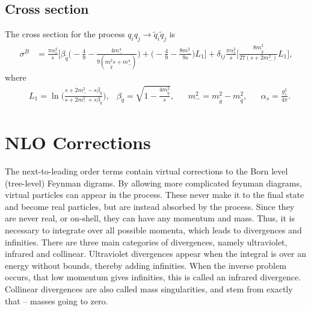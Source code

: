 \documentclass[twoside,english]{uiofysmaster}
\begin{document}
\subsection*{Cross section}

The cross section for the process $q_iq_j \rightarrow \tilde{q}_i \tilde{q}_j$ is \cite{beenakker1997squark}
\begin{align*}
\sigma^B &= \frac{\pi \alpha_s^2}{s} \Bigg[\beta_{\tilde{q}} \Big(-\frac{4}{9} - \frac{4m_-^4}{9(m_{\tilde{g}}^2s+m_-^4)} \Big) + \Big(-\frac{4}{9}- \frac{8m_-^2}{9s} \Big) L_1 \Bigg]
+ \delta_{ij} \frac{\pi \alpha_s^2}{s} \Bigg[ \frac{8m_{\tilde{g}}^2}{27(s+2m_-^2)} L_1 \Bigg],
\end{align*}
where
\begin{align*}
&L_1 = \ln \Big( \frac{s+2m_-^2-s \beta_{\tilde{q}}}{s+ 2m_-^2+s \beta_{\tilde{q}}} \Big), &\beta_{\tilde{q}} = \sqrt{1-\frac{4m_{\tilde{q}}^2}{s}}, &&m_-^2 = m_{\tilde{g}}^2 - m_{\tilde{q}}^2, &&\alpha_s = \frac{g_s^2}{4 \pi}.
\end{align*}

\section{NLO Corrections}

The next-to-leading order terms contain virtual corrections to the Born level (tree-level) Feynman digrams. By allowing more complicated feynman diagrams, virtual particles can appear in the process. These never make it to the final state and become real particles, but are instead absorbed by the process. Since they are never real, or on-shell, they can have any momentum and mass. Thus, it is necessary to integrate over all possible momenta, which leads to divergences and infinities. There are three main categories of divergences, namely ultraviolet, infrared and collinear. Ultraviolet divergences appear when the integral is over an energy without bounds, thereby adding infinities. When the inverse problem occurs, that low momentum gives infinities, this is called an infrared divergence. Collinear divergences are also called mass singularities, and stem from exactly that -- masses going to zero.
\end{document}
